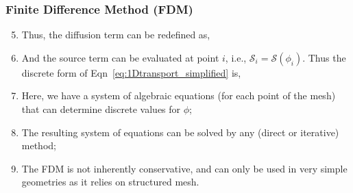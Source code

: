 \documentclass[10pt,compress]{beamer}
\begin{document}
\begin{frame}
 \frametitle{Finite Difference Method (FDM)} 

\begin{enumerate}
   \setcounter{enumi}{4}
  \item <1-> Thus, the diffusion term can be redefined as,
  \item <2-> And the source term can be evaluated at point $i$, i.e., $\mathcal{S}_{i}=\mathcal{S}\left(\phi_{i}\right)$. Thus the discrete form of Eqn~\ref{eq:1Dtransport_simplified} is,
  \item <3-> Here, we have a system of algebraic equations (for each point of the mesh) that can determine discrete values for $\phi$;
  \item <4-> The resulting system of equations can be solved by any (direct or iterative) method;
  \item <5-> The FDM is not inherently conservative, and can only be used in very simple geometries as it relies on structured mesh.

\end{enumerate}  
 
\end{frame}
\end{document}
